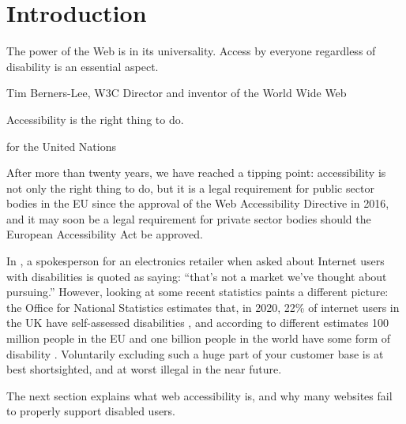 \section{Introduction}

\epigraph{The power of the Web is in its universality. Access by everyone regardless
  of disability is an essential aspect.}{Tim Berners-Lee, W3C Director and inventor of the World Wide Web}

\epigraph{Accessibility is the right thing to do.}{ for the United Nations}

\noindent
After more than twenty years, we have reached a tipping point: accessibility is not only
the right thing to do, but it is a legal requirement for public sector bodies in the EU
since the approval of the Web Accessibility Directive in 2016, and it may soon be a legal
requirement for private sector bodies should the European Accessibility Act be approved.

In , a spokesperson for an electronics retailer when asked about
Internet users with disabilities is quoted as saying: ``that's not a market we've
thought about pursuing.'' However, looking at some recent statistics paints a different
picture: the Office for National Statistics estimates that, in 2020, 22\% of internet
users in the UK have self-assessed disabilities \citeyear{ukinternetusers2020}, and
according to different estimates 100 million people in the EU and one billion people in
the world have some form of disability \cite{euWebAccessibility2021,
  whoDisability2021}. Voluntarily excluding such a huge part of your customer base is at
best shortsighted, and at worst illegal in the near future.

The next section explains what web accessibility is, and why many websites fail to
properly support disabled users.
